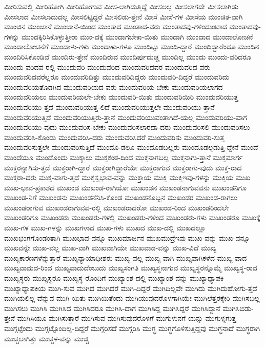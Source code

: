 {ಮೀರಿಸುವಲ್ಲಿ
ಮೀರಿಹೋಗಿ
ಮೀರಿಹೋಗುವ
ಮೀಸ-ಲಾಗಿಡುತ್ತಿದ್ದೆ
ಮೀಸಲಲ್ಲ
ಮೀಸಲಾಗದೇ
ಮೀಸಲಾಗಿಡು
ಮೀಸಲಾದ
ಮೀಸಲಾದುದಲ್ಲ
ಮೀಸಲಿಟ್ಟಿದ್ದರೆ
ಮೀಸಲಿಡು-ತ್ತೇನೆ
ಮೀಸೆ
ಮೀಸೆ-ಗಳ
ಮೀಸೆಯ
ಮುಂಚಿತ-ವಾಗಿ
ಮುಂಚಿನ
ಮುಂಜಾನೆ
ಮುಂಜಾನೆ-ಯಿಂದ
ಮುಂತಾದ
ಮುಂತಾದ-ವರು
ಮುಂತಾದವು-ಗಳಿಂದುಂಟಾದ
ಮುಂತಾದವು-ಗಳನ್ನು
ಮುಂದಕ್ಕಿರಿಸಿಕೊಳ್ಳುತ್ತೀರಾ
ಮುಂ-ದಕ್ಕೆ
ಮುಂದಾಗಬೇಕಾ-ಯಿತು
ಮುಂದಾಗಿ
ಮುಂದಾದ
ಮುಂದಾಲೋಚನೆ
ಮುಂದಾಲೋಚನೆಗೆ
ಮುಂದಾಳು-ಗಳು
ಮುಂದಾಳು-ಗಳೂ
ಮುಂದಿಟ್ಟು
ಮುಂದಿ-ದ್ದಾರೆ
ಮುಂದಿದ್ದಾರೆಂದೂ
ಮುಂದಿನ
ಮುಂದಿರಿಸಿಕೊಂಡಿವೆ
ಮುಂದಿರು-ತ್ತೇನೆ
ಮುಂದಿರುವ
ಮುಂದಿರ್ಪುದುಚ್ಚ
ಮುಂದಿಲ್ಲ
ಮುಂದು
ಮುಂದು-ವರಿದರೂ
ಮುಂದು-ವರಿದವ-ರಲ್ಲಿ
ಮುಂದುವರಿ
ಮುಂದುವರಿದ
ಮುಂದುವರಿದವರ
ಮುಂದುವರಿದ-ವರು
ಮುಂದುವರಿದವರೆಲ್ಲರೂ
ಮುಂದುವರಿದಿತ್ತು
ಮುಂದುವರಿದಿದ್ದರು
ಮುಂದುವರಿ-ದಿದ್ದರೆ
ಮುಂದುವರಿದು
ಮುಂದುವರಿಯತೊಡಗಿದ
ಮುಂದುವರಿಯದ-ವರು
ಮುಂದುವರಿಯ-ಬೇಕು
ಮುಂದುವರಿಯಲಾಗದ
ಮುಂದುವರಿಯಲು
ಮುಂದುವರಿಯಲೇ-ಬೇಕು
ಮುಂದುವರಿ-ಯಿತು
ಮುಂದುವರಿಯಿರಿ
ಮುಂದುವರಿಯುತ್ತ
ಮುಂದುವರಿಯು-ತ್ತದೆ
ಮುಂದುವರಿಯುತ್ತ-ಲಿದೆ
ಮುಂದುವರಿಯುತ್ತಲೇ
ಮುಂದುವರಿಯು-ತ್ತಾನೆ
ಮುಂದುವರಿಯುತ್ತಿದೆ
ಮುಂದುವರಿಯುತ್ತಿರು-ತ್ತಾನೆ
ಮುಂದುವರಿಯುವಂತಾಗಿದೆ-ಯಲ್ಲ
ಮುಂದುವರಿಯು-ವಾಗ
ಮುಂದುವರಿಯು-ವುದು
ಮುಂದುವರಿಸ-ಬೇಕು
ಮುಂದುವರಿಸಲಾರದಾ-ದರು
ಮುಂದುವರಿಸಲಿ
ಮುಂದುವರಿಸಲು
ಮುಂದುವರಿಸಿ-ಕೊಂಡು
ಮುಂದುವರಿಸಿ-ದರು
ಮುಂದುವರಿಸಿದರೆ
ಮುಂದುವರಿಸು
ಮುಂದುವರಿ-ಸುತ್ತ
ಮುಂದುವರಿಸುತ್ತಲೇ
ಮುಂದುವರಿಸುತ್ತಿದೆ
ಮುಂದೂ-ಡಲೂ
ಮುಂದೂಡಬಲ್ಲರು
ಮುಂದೂಡಲ್ಪಡುತ್ತಿ-ದ್ದೇನೆ
ಮುಂದೆ
ಮುಂದೆಯೂ
ಮುಂದೊಂದು
ಮುಕ್ಕಾಲು
ಮುಕ್ತಕಂಠ-ದಿಂದ
ಮುಕ್ತನಾಗಬಲ್ಲ
ಮುಕ್ತನಾಗು-ತ್ತಾನೆ
ಮುಕ್ತಮಾರ್ಗ
ಮುಕ್ತರನ್ನಾಗಿಸು-ತ್ತದೆ
ಮುಕ್ತರಾಗಿ-ದ್ದಾರೆ
ಮುಕ್ತರಾಗಿದ್ದಾರೆಯೇ
ಮುಕ್ತರಾಗುವ
ಮುಕ್ತರಾಗು-ವುದು
ಮುಕ್ತ-ರಾದ
ಮುಕ್ತರಾ-ದರು
ಮುಕ್ತ-ವಾಗು-ತ್ತದೆ
ಮುಕ್ತಸ್ವಭಾವ-ವನ್ನು
ಮುಕ್ತಾಯ
ಮುಕ್ತಿ
ಮುಕ್ತಿಇವು-ಗಳನ್ನು
ಮುಕ್ತಿಯ
ಮುಖ
ಮುಖ-ಭಾವ-ಪ್ರಕಾಶದ
ಮುಖಂಡ
ಮುಖಂಡ-ರಾಗಿಯೋ
ಮುಖಂಡನ
ಮುಖಂಡನಾಗುವವನು
ಮುಖಂಡನಿಗೂ
ಮುಖಂಡ-ನಿಗೆ
ಮುಖಂಡನು
ಮುಖಂಡನೆನಿಸಿ-ಕೊಂಡ
ಮುಖಂಡನೊಬ್ಬನ
ಮುಖಂಡರ
ಮುಖಂಡ-ರಾಗಲು
ಮುಖಂಡರಾಗುವ
ಮುಖಂಡರಾಗುವವ-ರಲ್ಲಿ
ಮುಖಂಡರಾದರೋ
ಮುಖಂಡ-ರಿಂದ
ಮುಖಂಡರಿಂದಲೇ
ಮುಖಂಡರಿಗೂ
ಮುಖಂಡರು
ಮುಖಂಡರು-ಗಳಲ್ಲಿ
ಮುಖಂಡರು-ಗಳಿಂದ
ಮುಖಂಡರು-ಗಳು
ಮುಖಂಡರೂ
ಮುಖಕ್ಕೆ
ಮುಖ-ಗಳ
ಮುಖ-ಗಳನ್ನು
ಮುಖಗಳಾದ
ಮುಖ-ಗಳು
ಮುಖದ
ಮುಖ-ದಲ್ಲಿ
ಮುಖದಲ್ಲೂ
ಮುಖಭಂಗಗೊಂಡಂತಾಗಿ
ಮುಖಭಾವ-ವನ್ನೂ
ಮುಖಮಾರ್ಜನ
ಮುಖಮುದ್ರೆಇವು
ಮುಖ-ವನ್ನು
ಮುಖ-ವನ್ನೂ
ಮುಖವನ್ನೇ
ಮುಖ-ವಲ್ಲ
ಮುಖ-ವಾಗಿ
ಮುಖವಾಗಿಯೇ
ಮುಖವಾಡ-ವನ್ನು
ಮುಖ-ವಿದೆ
ಮುಖ್ಯ
ಮುಖ್ಯಕಾರಣಗಳೆನ್ನುತ್ತಾರೆ
ಮುಖ್ಯನ್ಯಾಯಾಧೀಶರು
ಮುಖ್ಯ-ವಲ್ಲ
ಮುಖ್ಯ-ವಾಗಿ
ಮುಖ್ಯವಾಗಿಕಳೆದ
ಮುಖ್ಯ-ವಾದ
ಮುಖ್ಯವಾದುದ-ರಿಂದ
ಮುಖ್ಯವಾದುದೆಂಬುದು
ಮುಖ್ಯಸಂಗತಿ
ಮುಖ್ಯಸ್ಥನಾಗುವ
ಮುಖ್ಯಸ್ಥರನ್ನೊಮ್ಮೆ
ಮುಖ್ಯಸ್ಥ-ರಾದ
ಮುಖ್ಯಸ್ಥರು
ಮುಖ್ಯಸ್ಥರೂ
ಮುಖ್ಯಸ್ಥ-ರೊಂದಿಗೆ
ಮುಖ್ಯಾಂಶ-ದಲ್ಲಿ
ಮುಖ್ಯಾಂಶ-ವನ್ನು
ಮುಖ್ಯಾಧ್ಯಾಪಕಿ
ಮುಖ್ಯಾಧ್ಯಾಪಕಿಯ
ಮುಗಿ-ಸುವ
ಮುಗಿದ
ಮುಗಿದರೆ
ಮುಗಿ-ದಿದ್ದರೆ
ಮುಗಿದಿಲ್ಲವೇ
ಮುಗಿದು
ಮುಗಿದುಹೋಗು-ತ್ತದೆ
ಮುಗಿಯಲಿಲ್ಲ-ವೆನ್ನುವ
ಮುಗಿ-ಯಿತು
ಮುಗಿಯಿತೆಂದು
ಮುಗಿಯುವುದರೊಳಗಾಗಿಯೇ
ಮುಗಿಲೆತ್ತರಕ್ಕೇರಿ
ಮುಗಿಸಬಲ್ಲ
ಮುಗಿಸಲು
ಮುಗಿಸಿ
ಮುಗಿಸಿದ
ಮುಗಿಸಿದರೂ
ಮುಗಿಸಿ-ದಾಗ
ಮುಗಿಸಿದ್ದ
ಮುಗಿಸಿದ್ದರೆ
ಮುಗಿಸಿದ್ದಾನೆ
ಮುಗಿಸಿಬಿಡು-ತ್ತೇನೆ
ಮುಗಿಸಿಯೂ
ಮುಗಿಸುತ್ತಾರೆ
ಮುಗಿಸುವ
ಮುಗಿಸುವುದರೊಳಗೆ
ಮುಗುಳುನಗೆ-ಯನ್ನು
ಮುಗುಳ್ನಗುತ್ತ
ಮುಗ್ಗಟ್ಟೆಂದು
ಮುಗ್ಗಟ್ಟೊಂದಿಲ್ಲ-ದಿದ್ದರೆ
ಮುಗ್ಗರಿಸದೆ
ಮುಗ್ಗರಿಸಿ
ಮುಗ್ಧ
ಮುಗ್ಧಗೊಳಿಸುತ್ತಿದ್ದವು
ಮುಗ್ಧನಾದೆ
ಮುಗ್ಧರಾಗಿ
ಮುಚ್ಚಲಾಗಿತ್ತು
ಮುಚ್ಚಳ-ವನ್ನು
ಮುಚ್ಚಿ
}
